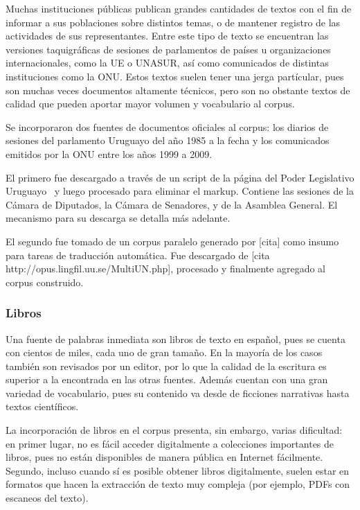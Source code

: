 Muchas instituciones públicas publican grandes cantidades de textos con el fin de informar a sus
poblaciones sobre distintos temas, o de mantener registro de las actividades de sus
representantes. Entre este tipo de texto se encuentran las versiones taquigráficas de sesiones de
parlamentos de países u organizaciones internacionales, como la UE o UNASUR, así como comunicados de
distintas instituciones como la ONU\@. Estos textos suelen tener una jerga partícular, pues son
muchas veces documentos altamente técnicos, pero son no obstante textos de calidad que pueden
aportar mayor volumen y vocabulario al corpus.

Se incorporaron dos fuentes de documentos oficiales al corpus: los diarios de sesiones del
parlamento Uruguayo del año 1985 a la fecha y los comunicados emitidos por la ONU entre los años
1999 a 2009.

El primero fue descargado a través de un script de la página del Poder Legislativo
Uruguayo~\cite{ParlamentoUruguay} y luego procesado para eliminar el markup. Contiene las sesiones
de la Cámara de Diputados, la Cámara de Senadores, y de la Asamblea General. El mecanismo para su
descarga se detalla más adelante.

El segundo fue tomado de un corpus paralelo generado por [cita] como insumo para tareas de
traducción automática. Fue descargado de [cita http://opus.lingfil.uu.se/MultiUN.php], procesado y
finalmente agregado al corpus construido.


\subsubsection{Libros}

Una fuente de palabras inmediata son libros de texto en español, pues se cuenta con cientos de
miles, cada uno de gran tamaño. En la mayoría de los casos también son revisados por un editor, por
lo que la calidad de la escritura es superior a la encontrada en las otras fuentes. Además cuentan
con una gran variedad de vocabulario, pues su contenido va desde de ficciones narrativas hasta
textos científicos.

La incorporación de libros en el corpus presenta, sin embargo, varias dificultad: en primer lugar,
no es fácil acceder digitalmente a colecciones importantes de libros, pues no están disponibles de
manera pública en Internet fácilmente. Segundo, incluso cuando sí es posible obtener libros
digitalmente, suelen estar en formatos que hacen la extracción de texto muy compleja (por ejemplo,
PDFs con escaneos del texto).

